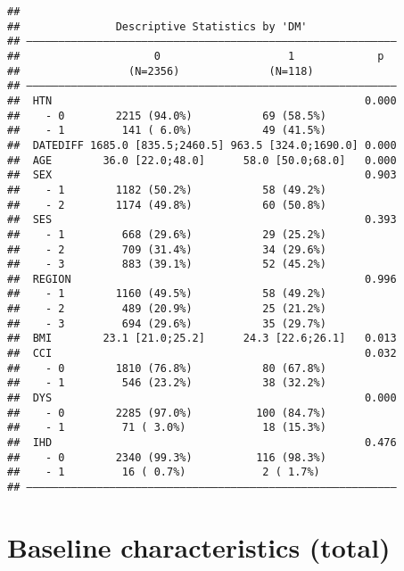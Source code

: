 \documentclass[
]{book}
\begin{document}
\begin{verbatim}
## 
##               Descriptive Statistics by 'DM'             
## —————————————————————————————————————————————————————————— 
##                     0                    1             p  
##                 (N=2356)              (N=118)       
## —————————————————————————————————————————————————————————— 
##  HTN                                                 0.000
##    - 0        2215 (94.0%)           69 (58.5%)           
##    - 1         141 ( 6.0%)           49 (41.5%)           
##  DATEDIFF 1685.0 [835.5;2460.5] 963.5 [324.0;1690.0] 0.000
##  AGE        36.0 [22.0;48.0]      58.0 [50.0;68.0]   0.000
##  SEX                                                 0.903
##    - 1        1182 (50.2%)           58 (49.2%)           
##    - 2        1174 (49.8%)           60 (50.8%)           
##  SES                                                 0.393
##    - 1         668 (29.6%)           29 (25.2%)           
##    - 2         709 (31.4%)           34 (29.6%)           
##    - 3         883 (39.1%)           52 (45.2%)           
##  REGION                                              0.996
##    - 1        1160 (49.5%)           58 (49.2%)           
##    - 2         489 (20.9%)           25 (21.2%)           
##    - 3         694 (29.6%)           35 (29.7%)           
##  BMI        23.1 [21.0;25.2]      24.3 [22.6;26.1]   0.013
##  CCI                                                 0.032
##    - 0        1810 (76.8%)           80 (67.8%)           
##    - 1         546 (23.2%)           38 (32.2%)           
##  DYS                                                 0.000
##    - 0        2285 (97.0%)          100 (84.7%)           
##    - 1         71 ( 3.0%)            18 (15.3%)           
##  IHD                                                 0.476
##    - 0        2340 (99.3%)          116 (98.3%)           
##    - 1         16 ( 0.7%)            2 ( 1.7%)            
## ——————————————————————————————————————————————————————————
\end{verbatim}

\hypertarget{baseline-characteristics-total}{%
\section{Baseline characteristics (total)}\label{baseline-characteristics-total}}
\end{document}
